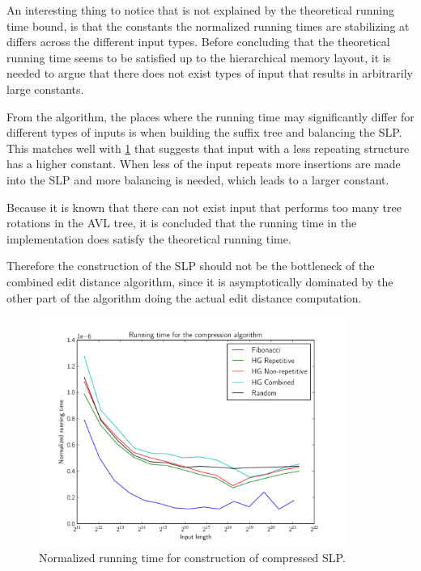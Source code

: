\documentclass[twoside,11pt,openright]{report}
\begin{document}
An interesting thing to notice that is not explained by the theoretical running time bound, is that the constants the normalized running times are stabilizing at differs across the different input types. Before concluding that the theoretical running time seems to be satisfied up to the hierarchical memory layout, it is needed to argue that there does not exist types of input that results in arbitrarily large constants.

From the algorithm, the places where the running time may significantly differ for different types of inputs is when building the suffix tree and balancing the SLP. This matches well with \cref{fig:compression:runningtime} that suggests that input with a less repeating structure has a higher constant. When less of the input repeats more insertions are made into the SLP and more balancing is needed, which leads to a larger constant.

Because it is known that there can not exist input that performs too many tree rotations in the AVL tree, it is concluded that the running time in the implementation does satisfy the theoretical running time.

Therefore the construction of the SLP should not be the bottleneck of the combined edit distance algorithm, since it is asymptotically dominated by the other part of the algorithm doing the actual edit distance computation.
%
\begin{figure}[htb]
  \centering
  \includegraphics[width=10cm]{compression/runningtime}
  \caption{Normalized running time for construction of compressed SLP.}
  \label{fig:compression:runningtime}
\end{figure}
\end{document}
